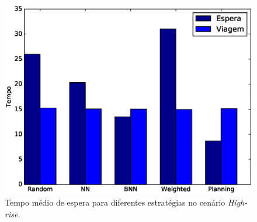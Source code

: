 \begin{figure}[htb]
  \centering
  \includegraphics[scale=0.8]{img/high-rise-average-times-chart}
  \caption[Tempo médio de espera no cenário \textit{High-rise}.]{Tempo médio de espera para diferentes estratégias no cenário \textit{High-rise}.}
  \label{fig:result:average:high-rise}
\end{figure}